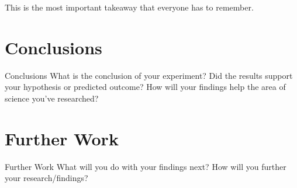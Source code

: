 \documentclass[aspectratio=169]{beamer}            %
\begin{document}
\begin{frame}[plain]
  This is the most important takeaway that everyone has to remember.
\end{frame}

\section{Conclusions}
\begin{frame}{Conclusions}
	What is the conclusion of your experiment?
	Did the results support your hypothesis or predicted outcome?
	How will your findings help the area of science you’ve researched?
\end{frame}

\section{Further Work}
\begin{frame}{Further Work}
	What will you do with your findings next?
	How will you further your research/findings?
\end{frame}

\end{document}
